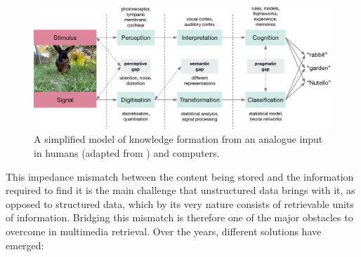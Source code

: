 \begin{figure}[tb]
    \centering
    \includegraphics[width=\textwidth]{figures/gaps.eps}
    \caption{A simplified model of knowledge formation from an analogue input in humans (adapted from \cite{Javanmardi:2021Exploring}) and computers.}
    \label{figure:knowledge_formation}
\end{figure}

This impedance mismatch between the content being stored and the information required to find it is the main challenge that unstructured data brings with it, as opposed to structured data, which by its very nature consists of retrievable units of information. Bridging this mismatch is therefore one of the major obstacles to overcome in multimedia retrieval. Over the years, different solutions have emerged:

